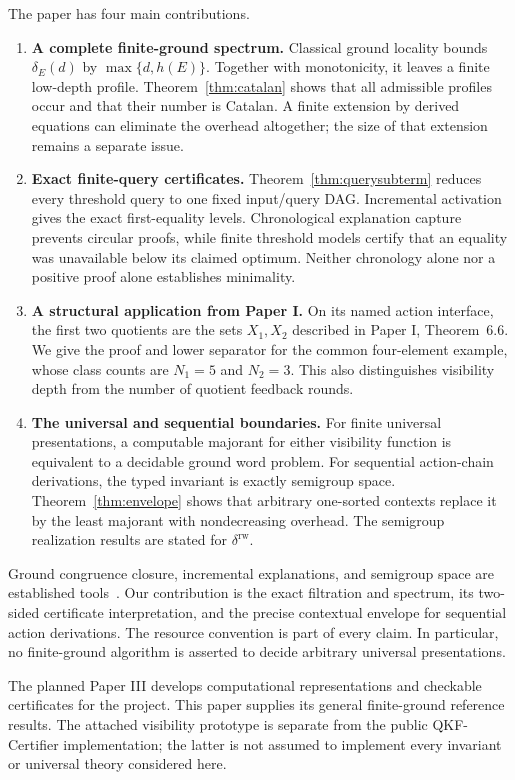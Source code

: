 The paper has four main contributions.
\begin{enumerate}
\item \textbf{A complete finite-ground spectrum.} Classical ground locality
bounds $\delta_E(d)$ by $\max\{d,h(E)\}$. Together with monotonicity, it
leaves a finite low-depth profile. Theorem~\ref{thm:catalan} shows that all
admissible profiles occur and that their number is Catalan. A finite
extension by derived equations can eliminate the overhead altogether;
the size of that extension remains a separate issue.
\item \textbf{Exact finite-query certificates.} Theorem~\ref{thm:querysubterm}
reduces every threshold query to one fixed input/query DAG. Incremental
activation gives the exact first-equality levels. Chronological explanation
capture prevents circular proofs, while finite threshold models certify
that an equality was unavailable below its claimed optimum. Neither
chronology alone nor a positive proof alone establishes minimality.
\item \textbf{A structural application from Paper I.} On its named action
interface, the first two quotients are the sets $X_1,X_2$ described in
Paper I, Theorem~6.6. We give the proof and lower separator for the common
four-element example, whose class counts are $N_1=5$ and $N_2=3$.
This also distinguishes visibility depth from the number of quotient
feedback rounds.
\item \textbf{The universal and sequential boundaries.} For finite
universal presentations, a computable majorant for either visibility
function is equivalent to a decidable ground word problem.
For sequential action-chain derivations, the typed invariant is exactly
semigroup space. Theorem~\ref{thm:envelope} shows that arbitrary one-sorted
contexts replace it by the least majorant with nondecreasing overhead.
The semigroup realization results are stated for $\delta^{\mathrm{rw}}$.
\end{enumerate}

Ground congruence closure, incremental explanations, and semigroup
space are established tools~\cite{NelsonOppen1980,DowneySethiTarjan1980,
NieuwenhuisOliveras2005,Olshanskii2013}. Our contribution is the exact
filtration and spectrum, its two-sided certificate interpretation, and
the precise contextual envelope for sequential action derivations.
The resource convention is part of every claim. In particular, no
finite-ground algorithm is asserted to decide arbitrary universal
presentations.

The planned Paper III develops computational representations and
checkable certificates for the project. This paper supplies its general
finite-ground reference results. The attached visibility prototype is
separate from the public QKF-Certifier implementation; the latter is not
assumed to implement every invariant or universal theory considered here.
